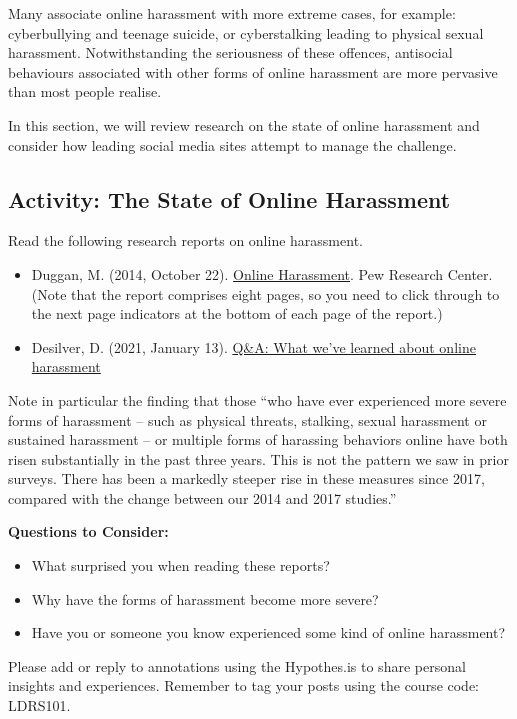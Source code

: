 \documentclass[
]{book}
\providecommand{\tightlist}{%
  \setlength{\itemsep}{0pt}\setlength{\parskip}{0pt}}
\theoremstyle{definition}
\theoremstyle{definition}
\theoremstyle{definition}
\theoremstyle{definition}
\theoremstyle{remark}
\begin{document}
Many associate online harassment with more extreme cases, for example: cyberbullying and teenage suicide, or cyberstalking leading to physical sexual harassment. Notwithstanding the seriousness of these offences, antisocial behaviours associated with other forms of online harassment are more pervasive than most people realise.

In this section, we will review research on the state of online harassment and consider how leading social media sites attempt to manage the challenge.

\hypertarget{activity-the-state-of-online-harassment}{%
\subsection*{Activity: The State of Online Harassment}\label{activity-the-state-of-online-harassment}}

\begin{reflect}
Read the following research reports on online harassment.

\begin{itemize}
\item
  Duggan, M. (2014, October 22). \href{https://www.pewresearch.org/internet/2014/10/22/online-harassment/}{Online Harassment}. Pew Research Center. (Note that the report comprises eight pages, so you need to click through to the next page indicators at the bottom of each page of the report.)
\item
  Desilver, D. (2021, January 13). \href{https://www.pewresearch.org/short-reads/2021/01/13/qa-what-weve-learned-about-online-harassment/}{Q\&A: What we've learned about online harassment}
\end{itemize}

Note in particular the finding that those ``who have ever experienced more severe forms of harassment -- such as physical threats, stalking, sexual harassment or sustained harassment -- or multiple forms of harassing behaviors online have both risen substantially in the past three years. This is not the pattern we saw in prior surveys. There has been a markedly steeper rise in these measures since 2017, compared with the change between our 2014 and 2017 studies.''

\textbf{Questions to Consider:}

\begin{itemize}
\tightlist
\item
  What surprised you when reading these reports?\\
\item
  Why have the forms of harassment become more severe?\\
\item
  Have you or someone you know experienced some kind of online harassment?
\end{itemize}

Please add or reply to annotations using the Hypothes.is to share personal insights and experiences. Remember to tag your posts using the course code: LDRS101.
\end{reflect}
\end{document}
